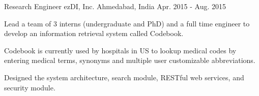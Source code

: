 \begin{cventries}
  \cventry
    {Research Engineer} %
    {ezDI, Inc.} %
    {Ahmedabad, India} %
    {Apr. 2015 - Aug. 2015} %
    {
      \begin{cvitems} %
      	\item Lead a team of 3 interns (undergraduate and PhD) and a full time engineer to develop an information retrieval system called Codebook.
      	\item Codebook is currently used by hospitals in US to lookup medical codes by entering medical terms, synonyms and multiple user customizable abbreviations.
      	\item Designed the system architecture, search module, RESTful web services, and security module.
      \end{cvitems}
    }

\end{cventries}
